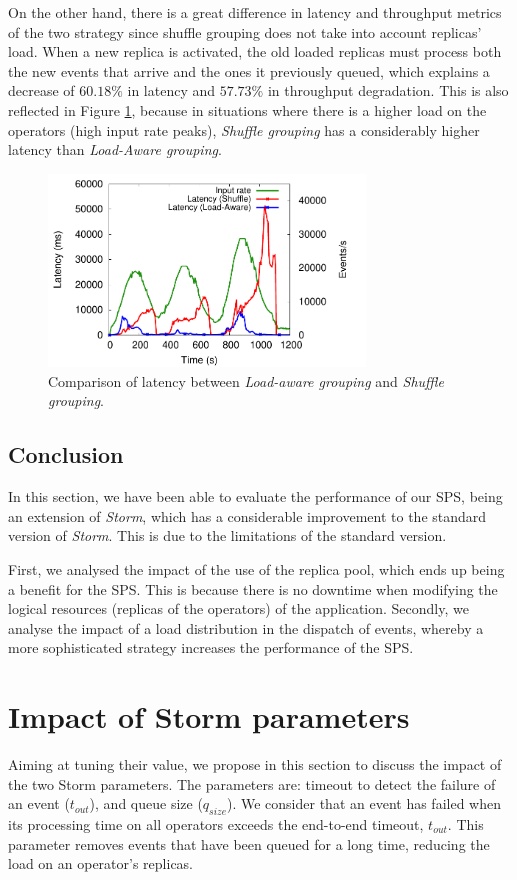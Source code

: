 On the other hand, there is a great difference in latency and throughput metrics of the two strategy since shuffle grouping does not take into account replicas' load. When a new replica is activated, the old loaded replicas must process both the new events that arrive and the ones it previously queued, which explains a decrease of $60.18\%$ in latency and $57.73\%$ in throughput degradation. This is also reflected in Figure \ref{fig:exp-grouping-latency}, because in situations where there is a higher load on the operators (high input rate peaks), \textit{Shuffle grouping} has a considerably higher latency than \textit{Load-Aware grouping}.

\begin{figure}[!ht]
     \centering
     \includegraphics[width=0.75\textwidth]{figures/exp/storm/Grouping-Latency.pdf}
     \caption{Comparison of latency between \textit{Load-aware grouping} and \textit{Shuffle grouping}.}
     \label{fig:exp-grouping-latency}
\end{figure}

\subsection{Conclusion}
In this section, we have been able to evaluate the performance of our SPS, being an extension of \textit{Storm}, which has a considerable improvement to the standard version of \textit{Storm}. This is due to the limitations of the standard version.

First, we analysed the impact of the use of the replica pool, which ends up being a benefit for the SPS. This is because there is no downtime when modifying the logical resources (replicas of the operators) of the application. Secondly, we analyse the impact of a load distribution in the dispatch of events, whereby a more sophisticated strategy increases the performance of the SPS.

\section{Impact of Storm parameters}
Aiming at tuning their value, we propose in this section to discuss the impact of the two Storm parameters. The parameters are: timeout to detect the failure of an event  ($t_{out}$), and queue size ($q_{size}$). We consider that an event has failed when its processing time on all operators exceeds the end-to-end timeout, $t_{out}$. This parameter removes events that have been queued for a long time, reducing the load on an operator's replicas.

